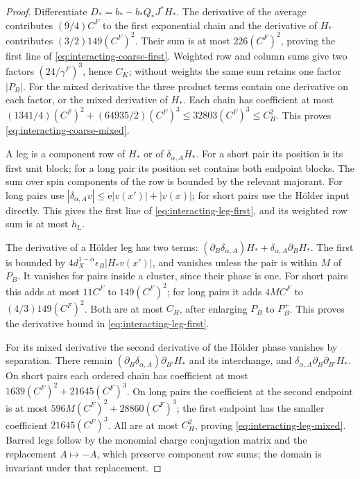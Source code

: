 \documentclass[11pt,letterpaper,reqno]{amsart}
\begin{document}
\begin{proof}
Differentiate $D_*=b_*-b_*Q_*J^*H_*$.
The derivative of the average contributes
$(9/4)C^F$ to the first exponential chain and
the derivative of $H_*$ contributes
$(3/2)149(C^F)^2$. Their sum is at most
$226(C^F)^2$, proving the first line of
\eqref{eq:interacting-coarse-first}.
Weighted row and column sums give two factors
$(24/\gamma^F)^3$, hence $C_K$; without weights
the same sum retains one factor $|P_B|$.
For the mixed derivative the three product
terms contain one derivative on each factor,
or the mixed derivative of $H_*$. Each chain
has coefficient at most
$(1341/4)(C^F)^2+(64935/2)(C^F)^3
\le32803(C^F)^3\le C_H^2$.
This proves \eqref{eq:interacting-coarse-mixed}.

A leg is a component row of $H_*$ or of
$\delta_{\alpha,A}H_*$. For a short pair its
position is its first unit block; for a long
pair its position set contains both endpoint
blocks. The sum over spin components of the
row is bounded by the relevant majorant.
For long pairs use
$|\delta_{\alpha,A}v|\le\mathrm e|v(x')|+|v(x)|$;
for short pairs use the Hölder input directly.
This gives the first line of
\eqref{eq:interacting-leg-first}, and its
weighted row sum is at most $h_{\mathrm L}$.

The derivative of a Hölder leg has two terms:
$(\partial_B\delta_{\alpha,A})H_*+
\delta_{\alpha,A}\partial_BH_*$.
The first is bounded by
$4d_X^{1-\alpha}\epsilon_B|H_*v(x')|$,
and vanishes unless the pair is within $M$
of $P_B$. It vanishes for pairs inside a
cluster, since their phase is one.
For short pairs this adds at most
$11C^F$ to $149(C^F)^2$; for long pairs
it adds $4MC^F$ to $(4/3)149(C^F)^2$.
Both are at most $C_H$, after enlarging
$P_B$ to $P_B^+$. This proves the derivative
bound in \eqref{eq:interacting-leg-first}.

For its mixed derivative the second derivative
of the Hölder phase vanishes by separation.
There remain
$(\partial_B\delta_{\alpha,A})\partial_{B'}H_*$
and its interchange, and
$\delta_{\alpha,A}\partial_B\partial_{B'}H_*$.
On short pairs each ordered chain has
coefficient at most
$1639(C^F)^2+21645(C^F)^3$.
On long pairs the coefficient at the second
endpoint is at most
$596M(C^F)^2+28860(C^F)^3$;
the first endpoint has the smaller coefficient
$21645(C^F)^3$. All are at most $C_H^2$,
proving \eqref{eq:interacting-leg-mixed}.
Barred legs follow by the monomial charge
conjugation matrix and the replacement $A\mapsto-A$,
which preserve component row sums; the domain
is invariant under that replacement.
\end{proof}
\end{document}
